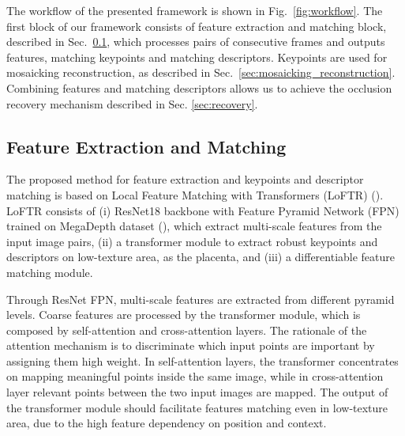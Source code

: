 \documentclass[sn-basic]{sn-jnl}%
\begin{document}
The workflow of the presented framework is shown in Fig.~\ref{fig:workflow}.
%
The first block of our framework consists of feature extraction and matching block, described in Sec.~\ref{sec:kfmatch}, which processes pairs of consecutive frames and outputs features, matching keypoints and matching descriptors. Keypoints are used for mosaicking reconstruction, as described in Sec.~\ref{sec:mosaicking_reconstruction}. Combining features and matching descriptors allows us to achieve the occlusion recovery mechanism described in Sec. \ref{sec:recovery}.

\subsection{Feature Extraction and Matching}\label{sec:kfmatch}
The proposed method for feature extraction and keypoints and descriptor matching is based on Local Feature Matching with Transformers (LoFTR) (\cite{Sun2021}).
LoFTR consists of (i) ResNet18 backbone with Feature Pyramid Network (FPN) trained on MegaDepth dataset (\cite{megadepth}), which extract multi-scale features from the input image pairs, (ii) a transformer module to extract robust keypoints and descriptors on low-texture area, as the placenta, and (iii) a differentiable feature matching module.


%

Through ResNet FPN, multi-scale features are extracted from different pyramid levels.
%
Coarse features are processed by the transformer module, which is composed by self-attention and cross-attention layers. The rationale of the attention mechanism is to discriminate which input points are important by assigning them high weight. In self-attention layers, the transformer concentrates on mapping meaningful points inside the same image, while in cross-attention layer relevant points between the two input images are mapped. The output of the transformer module should facilitate features matching even in low-texture area, due to the high feature dependency on position and context.
\end{document}
